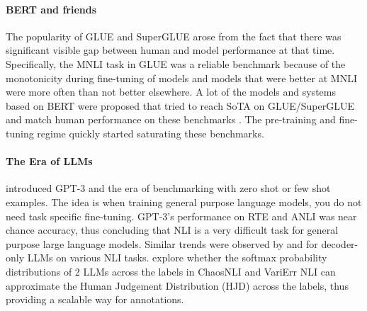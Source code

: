 \paragraph{BERT and friends} The popularity of GLUE \citep{wang2019glue} and SuperGLUE \citep{wang2019superglue} arose from the fact that there was significant visible gap between human and model performance at that time. Specifically, the MNLI task in GLUE was a reliable benchmark because of the monotonicity during fine-tuning of models and models that were better at MNLI were more often than not better elsewhere. A lot of the models and systems based on BERT \citep{devlin2019bert} were proposed that tried to reach SoTA on GLUE/SuperGLUE and match human performance on these benchmarks \citep{he2021deberta,he2021debertav3,patra2022englishcentric}. The pre-training and fine-tuning regime quickly started saturating these benchmarks.

\paragraph{The Era of LLMs} \citet{brown2020language} introduced GPT-3 and the era of benchmarking with zero shot or few shot examples. The idea is when training general purpose language models, you do not need task specific fine-tuning. GPT-3's performance on RTE and ANLI was near chance accuracy, thus concluding that NLI is a very difficult task for general purpose large language models. Similar trends were observed by \citet{ohmer2024form} and \citet{weber-etal-2023-mind} for decoder-only LLMs on various NLI tasks. \citet{chen2024seeingbig} explore whether the softmax probability distributions of 2 LLMs across the labels in ChaosNLI \citep{nie-etal-2020-learn} and VariErr NLI \citep{weber-genzel-etal-2024-varierr} can approximate the Human Judgement Distribution (HJD) across the labels, thus providing a scalable way for annotations.

